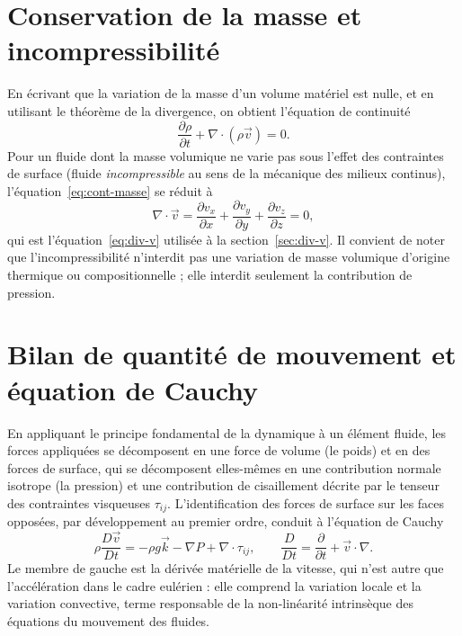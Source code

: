 \documentclass[11pt,a4paper]{report}
\newcommand{\divg}{\nabla\!\cdot\!}
\begin{document}
\section{Conservation de la masse et incompressibilité}

En écrivant que la variation de la masse d'un volume matériel est nulle, et en utilisant le théorème de
la divergence, on obtient l'équation de continuité
\begin{equation}
\frac{\partial\rho}{\partial t} + \divg\left(\rho\vec{v}\right) = 0 .
\label{eq:cont-masse}
\end{equation}
Pour un fluide dont la masse volumique ne varie pas sous l'effet des contraintes de surface (fluide
\emph{incompressible} au sens de la mécanique des milieux continus), l'équation~\eqref{eq:cont-masse} se
réduit à
\begin{equation}
\divg\vec{v} = \frac{\partial v_x}{\partial x} + \frac{\partial v_y}{\partial y}
+ \frac{\partial v_z}{\partial z} = 0 ,
\label{eq:ann-div}
\end{equation}
qui est l'équation~\eqref{eq:div-v} utilisée à la section~\ref{sec:div-v}. Il convient de noter que
l'incompressibilité n'interdit pas une variation de masse volumique d'origine thermique ou
compositionnelle ; elle interdit seulement la contribution de pression.

\section{Bilan de quantité de mouvement et équation de Cauchy}

En appliquant le principe fondamental de la dynamique à un élément fluide, les forces appliquées se
décomposent en une force de volume (le poids) et en des forces de surface, qui se décomposent elles-mêmes
en une contribution normale isotrope (la pression) et une contribution de cisaillement décrite par le
tenseur des contraintes visqueuses \(\tau_{ij}\). L'identification des forces de surface sur les faces
opposées, par développement au premier ordre, conduit à l'équation de Cauchy
\begin{equation}
\rho\frac{D\vec{v}}{Dt} = -\rho g\vec{k} - \nabla P + \nabla\cdot\tau_{ij},
\qquad
\frac{D}{Dt} = \frac{\partial}{\partial t} + \vec{v}\cdot\nabla .
\label{eq:cauchy}
\end{equation}
Le membre de gauche est la dérivée matérielle de la vitesse, qui n'est autre que l'accélération dans le
cadre eulérien : elle comprend la variation locale et la variation convective, terme responsable de la
non-linéarité intrinsèque des équations du mouvement des fluides.
\end{document}
